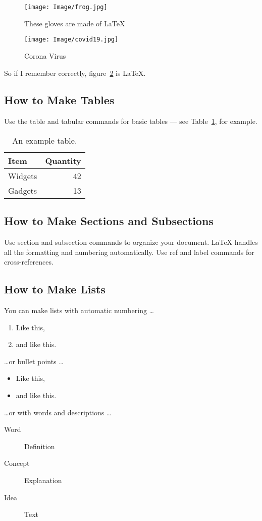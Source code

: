 \documentclass{article}
\begin{document}
\begin{figure}[ht]
  \centering
  \texttt{[image: Image/frog.jpg]}
  \caption{These gloves are made of \LaTeX{}}
  \label{fig:latex}
\end{figure}

\begin{figure}[ht]
    \centering
    \texttt{[image: Image/covid19.jpg]}
    \caption{Corona Virus}
    \label{fig:covid}
\end{figure}

So if I remember correctly, figure~\ref{fig:covid} is \LaTeX{}.

\subsection{How to Make Tables}

Use the table and tabular commands for basic tables --- see Table~\ref{tab:widgets}, for example.

\begin{table}[ht]
\centering
\begin{tabular}{l|r}
  Item & Quantity \\ \hline
  Widgets & 42 \\
  Gadgets & 13
\end{tabular}
\caption{\label{tab:widgets}An example table.}
\end{table}

\subsection{How to Make Sections and Subsections}

Use section and subsection commands to organize your document. \LaTeX{} handles all the formatting and numbering automatically. Use ref and label commands for cross-references.

\subsection{How to Make Lists}

You can make lists with automatic numbering \dots

\begin{enumerate}
\item Like this,
\item and like this.
\end{enumerate}
\dots or bullet points \dots
\begin{itemize}
\item Like this,
\item and like this.
\end{itemize}
\dots or with words and descriptions \dots
\begin{description}
\item[Word] Definition
\item[Concept] Explanation
\item[Idea] Text
\end{description}
\end{document}

